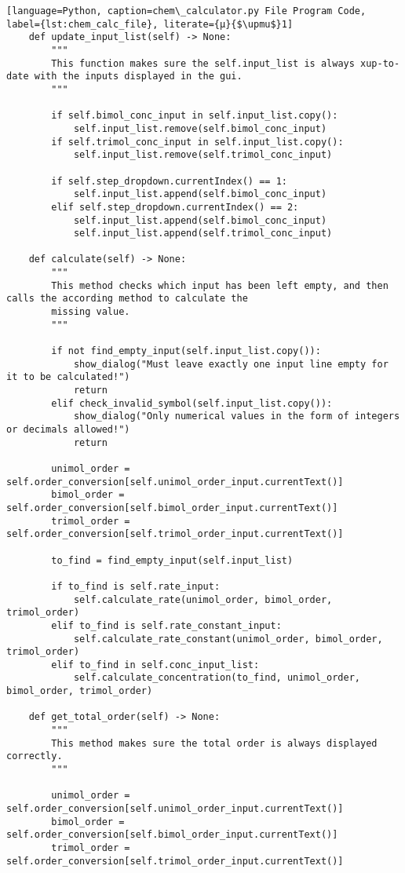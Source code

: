 \begin{lstlisting}[language=Python, caption=chem\_calculator.py File Program Code, label={lst:chem_calc_file}, literate={μ}{$\upmu$}1]
    def update_input_list(self) -> None:
        """
        This function makes sure the self.input_list is always xup-to-date with the inputs displayed in the gui.
        """

        if self.bimol_conc_input in self.input_list.copy():
            self.input_list.remove(self.bimol_conc_input)
        if self.trimol_conc_input in self.input_list.copy():
            self.input_list.remove(self.trimol_conc_input)

        if self.step_dropdown.currentIndex() == 1:
            self.input_list.append(self.bimol_conc_input)
        elif self.step_dropdown.currentIndex() == 2:
            self.input_list.append(self.bimol_conc_input)
            self.input_list.append(self.trimol_conc_input)

    def calculate(self) -> None:
        """
        This method checks which input has been left empty, and then calls the according method to calculate the
        missing value.
        """

        if not find_empty_input(self.input_list.copy()):
            show_dialog("Must leave exactly one input line empty for it to be calculated!")
            return
        elif check_invalid_symbol(self.input_list.copy()):
            show_dialog("Only numerical values in the form of integers or decimals allowed!")
            return

        unimol_order = self.order_conversion[self.unimol_order_input.currentText()]
        bimol_order = self.order_conversion[self.bimol_order_input.currentText()]
        trimol_order = self.order_conversion[self.trimol_order_input.currentText()]

        to_find = find_empty_input(self.input_list)

        if to_find is self.rate_input:
            self.calculate_rate(unimol_order, bimol_order, trimol_order)
        elif to_find is self.rate_constant_input:
            self.calculate_rate_constant(unimol_order, bimol_order, trimol_order)
        elif to_find in self.conc_input_list:
            self.calculate_concentration(to_find, unimol_order, bimol_order, trimol_order)

    def get_total_order(self) -> None:
        """
        This method makes sure the total order is always displayed correctly.
        """

        unimol_order = self.order_conversion[self.unimol_order_input.currentText()]
        bimol_order = self.order_conversion[self.bimol_order_input.currentText()]
        trimol_order = self.order_conversion[self.trimol_order_input.currentText()]


\end{lstlisting}
